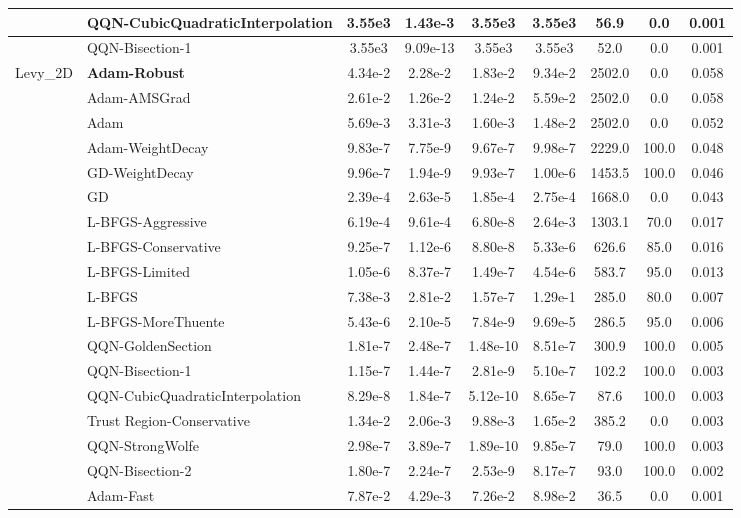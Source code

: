 \documentclass{article}
\begin{document}
\begin{longtable}{|l|l|c|c|c|c|c|c|c|}
\hline
 & QQN-CubicQuadraticInterpolation & 3.55e3 & 1.43e-3 & 3.55e3 & 3.55e3 & 56.9 & 0.0 & 0.001 \\
\hline
 & QQN-Bisection-1 & 3.55e3 & 9.09e-13 & 3.55e3 & 3.55e3 & 52.0 & 0.0 & 0.001 \\
Levy\_2D & \textbf{Adam-Robust} & 4.34e-2 & 2.28e-2 & 1.83e-2 & 9.34e-2 & 2502.0 & 0.0 & 0.058 \\
\hline
 & Adam-AMSGrad & 2.61e-2 & 1.26e-2 & 1.24e-2 & 5.59e-2 & 2502.0 & 0.0 & 0.058 \\
\hline
 & Adam & 5.69e-3 & 3.31e-3 & 1.60e-3 & 1.48e-2 & 2502.0 & 0.0 & 0.052 \\
\hline
 & Adam-WeightDecay & 9.83e-7 & 7.75e-9 & 9.67e-7 & 9.98e-7 & 2229.0 & 100.0 & 0.048 \\
\hline
 & GD-WeightDecay & 9.96e-7 & 1.94e-9 & 9.93e-7 & 1.00e-6 & 1453.5 & 100.0 & 0.046 \\
\hline
 & GD & 2.39e-4 & 2.63e-5 & 1.85e-4 & 2.75e-4 & 1668.0 & 0.0 & 0.043 \\
\hline
 & L-BFGS-Aggressive & 6.19e-4 & 9.61e-4 & 6.80e-8 & 2.64e-3 & 1303.1 & 70.0 & 0.017 \\
\hline
 & L-BFGS-Conservative & 9.25e-7 & 1.12e-6 & 8.80e-8 & 5.33e-6 & 626.6 & 85.0 & 0.016 \\
\hline
 & L-BFGS-Limited & 1.05e-6 & 8.37e-7 & 1.49e-7 & 4.54e-6 & 583.7 & 95.0 & 0.013 \\
\hline
 & L-BFGS & 7.38e-3 & 2.81e-2 & 1.57e-7 & 1.29e-1 & 285.0 & 80.0 & 0.007 \\
\hline
 & L-BFGS-MoreThuente & 5.43e-6 & 2.10e-5 & 7.84e-9 & 9.69e-5 & 286.5 & 95.0 & 0.006 \\
\hline
 & QQN-GoldenSection & 1.81e-7 & 2.48e-7 & 1.48e-10 & 8.51e-7 & 300.9 & 100.0 & 0.005 \\
\hline
 & QQN-Bisection-1 & 1.15e-7 & 1.44e-7 & 2.81e-9 & 5.10e-7 & 102.2 & 100.0 & 0.003 \\
\hline
 & QQN-CubicQuadraticInterpolation & 8.29e-8 & 1.84e-7 & 5.12e-10 & 8.65e-7 & 87.6 & 100.0 & 0.003 \\
\hline
 & Trust Region-Conservative & 1.34e-2 & 2.06e-3 & 9.88e-3 & 1.65e-2 & 385.2 & 0.0 & 0.003 \\
\hline
 & QQN-StrongWolfe & 2.98e-7 & 3.89e-7 & 1.89e-10 & 9.85e-7 & 79.0 & 100.0 & 0.003 \\
\hline
 & QQN-Bisection-2 & 1.80e-7 & 2.24e-7 & 2.53e-9 & 8.17e-7 & 93.0 & 100.0 & 0.002 \\
\hline
 & Adam-Fast & 7.87e-2 & 4.29e-3 & 7.26e-2 & 8.98e-2 & 36.5 & 0.0 & 0.001 \\

\end{longtable}
\end{document}
